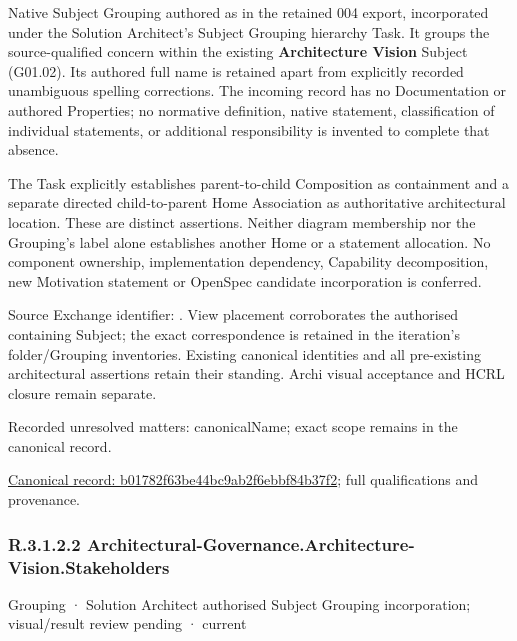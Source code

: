 Native Subject Grouping authored as \texttt{} in the retained 004 export,
incorporated under the Solution Architect's Subject Grouping hierarchy Task.
It groups the source-qualified \texttt{} concern within
the existing \textbf{Architecture Vision} Subject (G01.02). Its authored full name
is retained apart from explicitly recorded unambiguous spelling corrections.
The incoming record has no Documentation or authored Properties; no normative
definition, native statement, classification of individual statements, or
additional responsibility is invented to complete that absence.



The Task explicitly establishes parent-to-child Composition as containment and
a separate directed child-to-parent Home Association as authoritative architectural
location. These are distinct assertions. Neither diagram membership nor the
Grouping's label alone establishes another Home or a statement allocation.
No component ownership, implementation dependency, Capability decomposition,
new Motivation statement or OpenSpec candidate incorporation is conferred.



Source Exchange identifier: \texttt{}. View placement corroborates
the authorised containing Subject; the exact correspondence is retained in the
iteration's folder/Grouping inventories. Existing canonical identities and all
pre-existing architectural assertions retain their standing. Archi visual
acceptance and HCRL closure remain separate.


{\small Recorded unresolved matters: canonicalName; exact scope remains in the canonical record.}\par
{\footnotesize \href{../../../../continuum/grouping/b01782f63be44bc9ab2f6ebbf84b37f2.md}{Canonical record: b01782f63be44bc9ab2f6ebbf84b37f2}; full qualifications and provenance.}\par
\subsubsection*{R.3.1.2.2 Architectural-Governance.Architecture-Vision.Stakeholders}
\label{navigation:R.3.1.2.2}

\label{element:4f80f28b3dad490abe942e5bb37e1a80}
{\small Grouping · Solution Architect authorised Subject Grouping incorporation; visual/result review pending · current}\par

